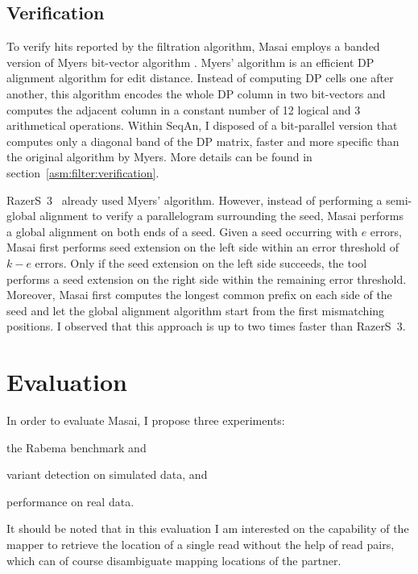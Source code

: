 \subsection{Verification}
\label{masai:engineering:extension}

To verify hits reported by the filtration algorithm, Masai employs a banded version of Myers bit-vector algorithm \citep{Myers1999}.
Myers' algorithm is an efficient DP alignment algorithm \citep{Needleman1970} for edit distance. 
Instead of computing DP cells one after another, this algorithm encodes the whole DP column in two bit-vectors and computes the adjacent column in a constant number of 12 logical and 3 arithmetical operations.
Within SeqAn, I disposed of a bit-parallel version that computes only a diagonal band of the DP matrix, faster and more specific than the original algorithm by Myers.
More details can be found in section~\ref{asm:filter:verification}.

RazerS~3~\citep{Weese2012} already used Myers' algorithm.
However, instead of performing a semi-global alignment to verify a parallelogram surrounding the seed, Masai performs a global alignment on both ends of a seed.
Given a seed occurring with $e$ errors, Masai first performs seed extension on the left side within an error threshold of $k - e$ errors.
Only if the seed extension on the left side succeeds, the tool performs a seed extension on the right side within the remaining error threshold.
Moreover, Masai first computes the longest common prefix on each side of the seed and let the global alignment algorithm start from the first mismatching positions.
I observed that this approach is up to two times faster than RazerS~3.


\section{Evaluation}

In order to evaluate Masai, I propose three experiments: \begin{inparaenum}[(i)]
\item the Rabema benchmark and
\item variant detection on simulated data, and
\item performance on real data.
\end{inparaenum}

It should be noted that in this evaluation I am interested on the capability of the mapper to retrieve the location of a single read without the help of read pairs, which can of course disambiguate mapping locations of the partner.

